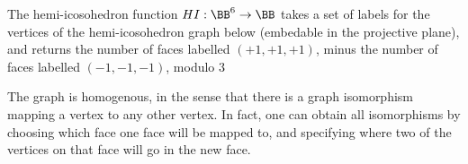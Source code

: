 \begin{example}
    The hemi-icosohedron function $HI: \BB^6 \to \BB$ takes a set of labels for the vertices of the hemi-icosohedron graph below (embedable in the projective plane), and returns the number of faces labelled $(+1,+1,+1)$, minus the number of faces labelled $(-1,-1,-1)$, modulo 3
\begin{center}
\end{center}
    The graph is homogenous, in the sense that there is a graph isomorphism mapping a vertex to any other vertex. In fact, one can obtain all isomorphisms by choosing which face one face will be mapped to, and specifying where two of the vertices on that face will go in the new face.


\end{example}
